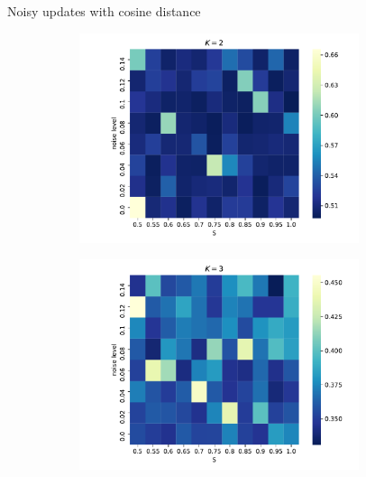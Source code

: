 \documentclass[11pt]{beamer}
\begin{document}
\begin{frame}{Noisy updates with cosine distance}
  \begin{figure}[t!]
    \centering
        \begin{subfigure}[t]{0.49\textwidth}
            \centering
            \includegraphics[width=0.9\textwidth]{Figures/p_v_noise_k=2_cosine_distance.pdf}
        \end{subfigure}
        \begin{subfigure}[t]{0.49\textwidth}
            \centering
            \includegraphics[width=0.9\textwidth]{Figures/p_v_noise_k=3_cosine_distance.pdf}
        \end{subfigure} \\
    \begin{subfigure}[t]{0.49\textwidth}
        \centering

\end{subfigure}
\end{figure}
\end{frame}
\end{document}
